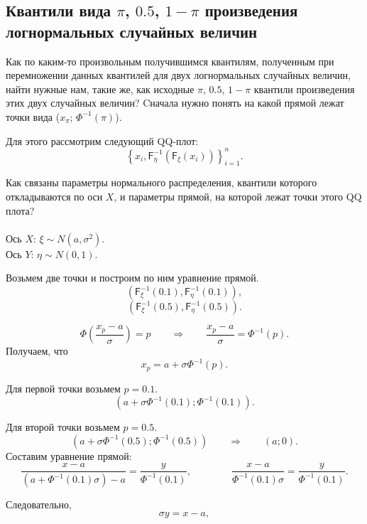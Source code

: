 \documentclass[12pt]{article}
\begin{document}
	
	
	\subsection{Квантили вида $\pi$, $0.5$, $1-\pi$ произведения логнормальных случайных величин}
	
	Как по каким-то произвольным получившимся квантилям, полученным при перемножении данных квантилей для двух логнормальных случайных величин, найти нужные нам, такие же, как исходные $\pi$, $0.5$, $1-\pi$ квантили произведения этих двух случайных величин? Cначала нужно понять на какой прямой лежат точки вида ($x_{\pi}$; $\Phi^{-1}(\pi)$).
	
	Для этого рассмотрим следующий QQ-плот:
	\[\left\{x_{i},\mathsf{F}_{\eta}^{-1}(\mathsf{F}_{\xi}(x_{i}))\right\}_{i=1}^{n}.\]
	
	Как связаны параметры нормального распределения, квантили которого откладываются по оси $X$, и параметры прямой, на которой лежат точки этого QQ плота?\\\\
	Ось $X$: $\xi \sim N(a, \sigma^{2})$.\\
	Ось $Y$: $\eta \sim N(0, 1)$.
	
	Возьмем две точки и построим по ним уравнение прямой.\\
	\[(\mathsf{F}_{\xi}^{-1}(0.1), \mathsf{F}_{\eta}^{-1}(0.1)),\]
	\[(\mathsf{F}_{\xi}^{-1}(0.5), \mathsf{F}_{\eta}^{-1}(0.5)).\]
	
	\begin{equation*}
		\Phi\left(\dfrac{x_{p}-a}{\sigma}\right)=p\quad\quad \Rightarrow \quad\quad \dfrac{x_{p}-a}{\sigma}=\Phi^{-1}(p).
	\end{equation*}
	Получаем, что
	\begin{equation*}
		x_{p}=a+\sigma\Phi^{-1}(p).
	\end{equation*}
	
	Для первой точки возьмем $p = 0.1$.
	\[(a+\sigma\Phi^{-1}(0.1); \Phi^{-1}(0.1)).\]
	
	Для второй точки возьмем $p = 0.5$.
	\[(a+\sigma\Phi^{-1}(0.5); \Phi^{-1}(0.5)) \quad\quad \Rightarrow \quad\quad (a;0). \]
	Составим уравнение прямой:
	\[\dfrac{x-a}{(a+\Phi^{-1}(0.1)\sigma)-a} = \dfrac{y}{\Phi^{-1}(0.1)}, \quad\quad\quad\quad \dfrac{x-a}{\Phi^{-1}(0.1)\sigma} = \dfrac{y}{\Phi^{-1}(0.1)}.\]
	
	Следовательно,
	\begin{equation*} 
		\sigma y = x-a,
	\end{equation*}
	
\end{document}
